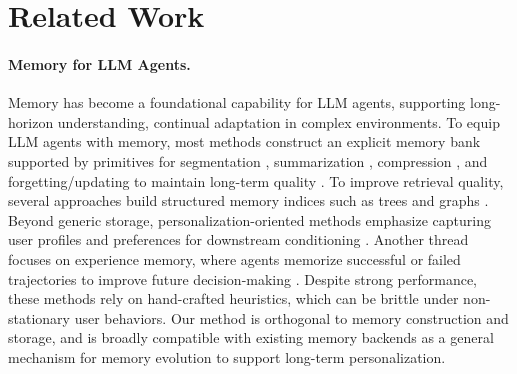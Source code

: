 \section{Related Work}

\paragraph{Memory for LLM Agents.}
Memory has become a foundational capability for LLM agents, supporting long-horizon understanding, continual adaptation in complex environments\cite{zhang2024survey_memoery,wu2025humansurveymemory,hu2025memoryageaiagentssurvey}.
To equip LLM agents with memory, most methods construct an explicit memory bank supported by primitives for  segmentation \cite{secom}, summarization \cite{kim2024theanine,RecurSum,SumMem,Think-in-memory,memochat,rasmussen2025zep}, compression \cite{chen2025compress,ReadAgent,recomp,COMEDY}, and forgetting/updating to maintain long-term quality \cite{memorybank,LD-Agent}.
To improve retrieval quality, several approaches build structured memory indices such as trees \cite{memtree,raptor} and graphs \cite{hipporag2,chhikara2025mem0,wang2025mirix,xu-etal-2024-multi}. Beyond generic storage, personalization-oriented methods emphasize capturing user profiles and preferences for downstream conditioning \cite{zhang2026personalize,xu2025harnessing,zhang2025personaagent,perltqa,fang2025lightmem,memorag}. Another thread focuses on experience memory, where agents memorize successful or failed trajectories to improve future decision-making \cite{packer2023memgpt,AWM,tang2025agentkb,ouyang2025reasoningbank,zhao2024expel,zhang2025gmemory,gao2025llm4rerank,jia2024mill}.  Despite strong performance, these methods rely on hand-crafted heuristics, which can be brittle under non-stationary user behaviors. Our method is orthogonal to memory construction and storage, and is broadly compatible with existing memory backends as a general mechanism for memory evolution to support long-term personalization.

